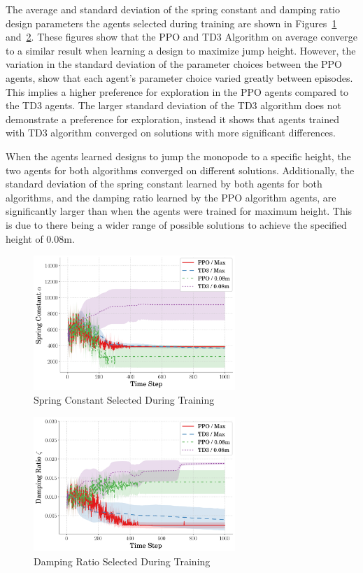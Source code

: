 \documentclass[10pt,twocolumn,letterpaper]{article}
\begin{document}
The average and standard deviation of the spring constant and damping ratio design parameters the agents selected during training are shown in Figures~\ref{fig:spring_vs_step} and~\ref{fig:zeta_vs_step}. These figures show that the PPO and TD3 Algorithm on average converge to a similar result when learning a design to maximize jump height. However, the variation in the standard deviation of the parameter choices between the PPO agents, show that each agent's parameter choice varied greatly between episodes. This implies a higher preference for exploration in the PPO agents compared to the TD3 agents. The larger standard deviation of the TD3 algorithm does not demonstrate a preference for exploration, instead it shows that agents trained with TD3 algorithm converged on solutions with more significant differences.

When the agents learned designs to jump the monopode to a specific height, the two agents for both algorithms converged on different solutions. Additionally, the standard deviation of the spring constant learned by both agents for both algorithms, and the damping ratio learned by the PPO algorithm agents, are significantly larger than when the agents were trained for maximum height. This is due to there being a wider range of possible solutions to achieve the specified height of 0.08m.
%
\begin{figure}[tb]
\begin{center}
        \includegraphics[width = 3in]{figures/ppo_vs_td3/avg_spring_comp.png}
        \caption{Spring Constant Selected During Training}
        \label{fig:spring_vs_step}
\end{center}
\end{figure}
%
\begin{figure}[tb]
        \begin{center}
                \includegraphics[width = 3in]{figures/ppo_vs_td3/avg_zeta_comp.png}
                \caption{Damping Ratio Selected During Training}
                \label{fig:zeta_vs_step}
        \end{center}
\end{figure}
\end{document}
